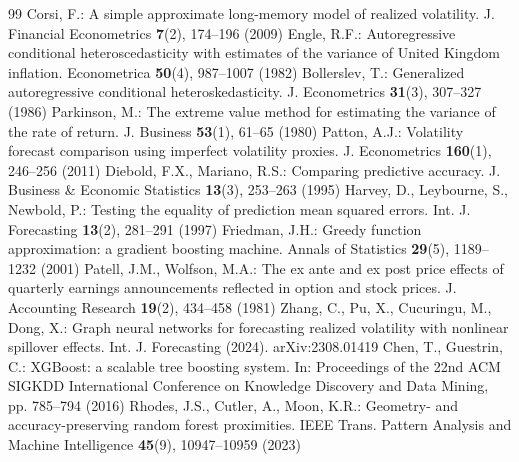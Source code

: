 \documentclass[runningheads]{llncs}
\begin{document}
\begin{thebibliography}{99}
 Corsi, F.: A simple approximate long-memory model of realized volatility. J. Financial Econometrics \textbf{7}(2), 174--196 (2009)
 Engle, R.F.: Autoregressive conditional heteroscedasticity with estimates of the variance of United Kingdom inflation. Econometrica \textbf{50}(4), 987--1007 (1982)
 Bollerslev, T.: Generalized autoregressive conditional heteroskedasticity. J. Econometrics \textbf{31}(3), 307--327 (1986)
 Parkinson, M.: The extreme value method for estimating the variance of the rate of return. J. Business \textbf{53}(1), 61--65 (1980)
 Patton, A.J.: Volatility forecast comparison using imperfect volatility proxies. J. Econometrics \textbf{160}(1), 246--256 (2011)
 Diebold, F.X., Mariano, R.S.: Comparing predictive accuracy. J. Business \& Economic Statistics \textbf{13}(3), 253--263 (1995)
 Harvey, D., Leybourne, S., Newbold, P.: Testing the equality of prediction mean squared errors. Int. J. Forecasting \textbf{13}(2), 281--291 (1997)
 Friedman, J.H.: Greedy function approximation: a gradient boosting machine. Annals of Statistics \textbf{29}(5), 1189--1232 (2001)
 Patell, J.M., Wolfson, M.A.: The ex ante and ex post price effects of quarterly earnings announcements reflected in option and stock prices. J. Accounting Research \textbf{19}(2), 434--458 (1981)
 Zhang, C., Pu, X., Cucuringu, M., Dong, X.: Graph neural networks for forecasting realized volatility with nonlinear spillover effects. Int. J. Forecasting (2024). arXiv:2308.01419
 Chen, T., Guestrin, C.: XGBoost: a scalable tree boosting system. In: Proceedings of the 22nd ACM SIGKDD International Conference on Knowledge Discovery and Data Mining, pp. 785--794 (2016)
 Rhodes, J.S., Cutler, A., Moon, K.R.: Geometry- and accuracy-preserving random forest proximities. IEEE Trans. Pattern Analysis and Machine Intelligence \textbf{45}(9), 10947--10959 (2023)
\end{thebibliography}
\end{document}
